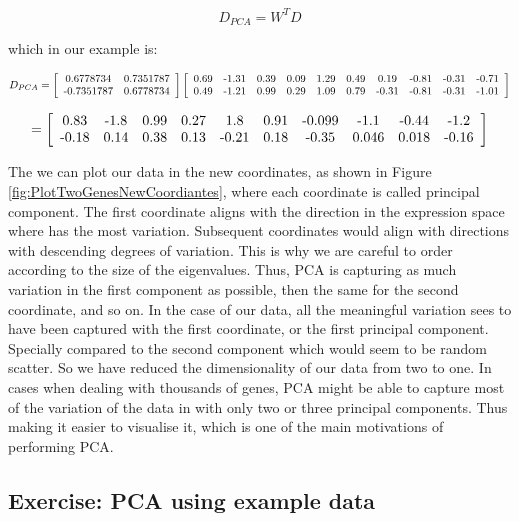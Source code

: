\documentclass[11pt, oneside]{article}   	%
\begin{document}
\[
   D_{PCA} = W^T D
\]

\noindent which in our example is:

\[
   D_{PCA} = 
   \left[ \begin{array}{cc}
	0.6778734 & 0.7351787 \\
	$-0.7351787$ & 0.6778734
   \end{array} \right]
   \left[ \begin{array}{cccccccccc}
      0.69 & $-1.31$ & 0.39 & 0.09 & 1.29 & 0.49 & 0.19 & $-0.81$ & $-0.31$ & $-0.71$ \\
      0.49 & $-1.21$ & 0.99 & 0.29 & 1.09 & 0.79 & $-0.31$ & $-0.81$ & $-0.31$ & $-1.01$
   \end{array} \right]
\]

\[
   =
   \left[ \begin{array}{cccccccccc}
      0.83 & $-1.8$ & 0.99 & 0.27 & 1.8 & 0.91 & $-0.099$ & $-1.1$ & $-0.44$ & $-1.2$ \\
      $-0.18$ & 0.14 & 0.38 & 0.13 & $-0.21$ & 0.18 & $-0.35$ & 0.046 & 0.018 & $-0.16$
   \end{array} \right]
\]


The we can plot our data in the new coordinates, as shown in Figure \ref{fig:PlotTwoGenesNewCoordiantes}, where each coordinate is called principal component. 
The first coordinate aligns with the direction in the expression space where has the most variation. Subsequent coordinates would align with directions with descending degrees of variation. This is why we are careful to order according to the size of the eigenvalues.
Thus, PCA is capturing as much variation in the first component as possible, then the same for the second coordinate, and so on.
In the case of our data, all the meaningful variation sees to have been captured with the first coordinate, or the first principal component. Specially compared to the second component which would seem to be random scatter. So we have reduced the dimensionality of our data from two to one. In cases when dealing with thousands of genes, PCA might be able to capture most of the variation of the data in with only two or three principal components. Thus making it easier to visualise it, which is one of the main motivations of performing PCA.



\subsection{Exercise: PCA using example data}
\end{document}

